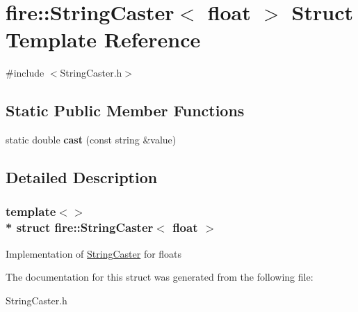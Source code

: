 \hypertarget{a00032}{}\section{fire\+:\+:String\+Caster$<$ float $>$ Struct Template Reference}
\label{a00032}


{\ttfamily \#include $<$String\+Caster.\+h$>$}

\subsection*{Static Public Member Functions}
\begin{DoxyCompactItemize}
\item 
static double {\bfseries cast} (const string \&value)\hypertarget{a00032_a3dbc17ad2b6b2185fea43993871f24f7}{}\label{a00032_a3dbc17ad2b6b2185fea43993871f24f7}

\end{DoxyCompactItemize}


\subsection{Detailed Description}
\subsubsection*{template$<$$>$\\*
struct fire\+::\+String\+Caster$<$ float $>$}

Implementation of \hyperlink{a00029}{String\+Caster} for floats 

The documentation for this struct was generated from the following file\+:\begin{DoxyCompactItemize}
\item 
String\+Caster.\+h\end{DoxyCompactItemize}
